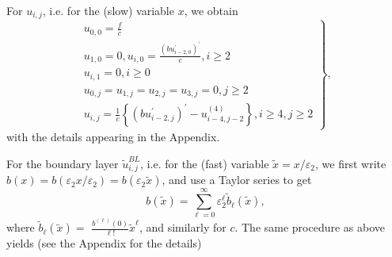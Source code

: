 \documentclass[12pt]{article}
\begin{document}
For $u_{i,j}$, i.e. for the (slow) variable $x$, we obtain
%
\begin{equation}
\left. 
\begin{array}{c}
u_{0,0} = \frac{f}{c} \\
u_{1,0}=0,u_{i,0}=\frac{\left( bu_{i-2,0}^{\prime }\right) ^{\prime }}{c}%
,i\geq 2 \\  
u_{i,1}=0,i\geq 0 \\
u_{0,j}=u_{1,j}=u_{2,j}=u_{3,j}=0,j\geq 2 \\
u_{i,j}=\frac{1}{c}\left\{ \left( bu_{i-2,j}^{\prime }\right) ^{\prime
}-u_{i-4,j-2}^{(4)}\right\} ,i\geq 4,j\geq 2%
\end{array}%
\right\},  \label{uij}
\end{equation}
with the details appearing in the Appendix.

For the boundary layer $\tilde{u}_{i,j}^{BL}$, i.e. for the (fast) variable $%
\tilde{x}=x/\varepsilon _{2}$, we first write $%
b(x)=b(\varepsilon _{2}x/\varepsilon _{2})=b(\varepsilon _{2}\tilde{x})$, and use a Taylor series to get
%
\begin{equation*}
b(\tilde{x})=\sum_{\ell =0}^{\infty }\varepsilon _{2}^{\ell } \tilde{b}_{\ell }(\tilde{x}),
\end{equation*}%
where $\tilde{b}_{\ell }(\tilde{x})=$ $\frac{b^{(\ell )}(0)}{\ell !}\tilde{x}^{\ell }$, and
similarly for $c$. The same procedure as above yields (see the Appendix for the details)
%
\end{document}
